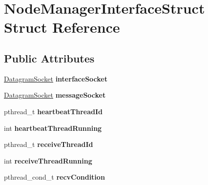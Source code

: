 \hypertarget{struct_node_manager_interface_struct}{\section{\-Node\-Manager\-Interface\-Struct \-Struct \-Reference}
\label{struct_node_manager_interface_struct}
}
\subsection*{\-Public \-Attributes}
\begin{DoxyCompactItemize}
\item 
\hypertarget{struct_node_manager_interface_struct_adf39208cd6a85821e2f73670a50ed920}{\hyperlink{struct_datagram_socket_struct}{\-Datagram\-Socket} {\bfseries interface\-Socket}}\label{struct_node_manager_interface_struct_adf39208cd6a85821e2f73670a50ed920}

\item 
\hypertarget{struct_node_manager_interface_struct_ac996af73bca622eae4af573fd14b31ca}{\hyperlink{struct_datagram_socket_struct}{\-Datagram\-Socket} {\bfseries message\-Socket}}\label{struct_node_manager_interface_struct_ac996af73bca622eae4af573fd14b31ca}

\item 
\hypertarget{struct_node_manager_interface_struct_a41ec3bd4404424d8493b4f8d8d02d9b8}{pthread\-\_\-t {\bfseries heartbeat\-Thread\-Id}}\label{struct_node_manager_interface_struct_a41ec3bd4404424d8493b4f8d8d02d9b8}

\item 
\hypertarget{struct_node_manager_interface_struct_a318dbb2bdae9caacb235e0fc8735bb2b}{int {\bfseries heartbeat\-Thread\-Running}}\label{struct_node_manager_interface_struct_a318dbb2bdae9caacb235e0fc8735bb2b}

\item 
\hypertarget{struct_node_manager_interface_struct_a57bf6e233c0940a4365deaa3b0fa6e1a}{pthread\-\_\-t {\bfseries receive\-Thread\-Id}}\label{struct_node_manager_interface_struct_a57bf6e233c0940a4365deaa3b0fa6e1a}

\item 
\hypertarget{struct_node_manager_interface_struct_a55f9a2806c2d0f026a9027a4bc3b3e90}{int {\bfseries receive\-Thread\-Running}}\label{struct_node_manager_interface_struct_a55f9a2806c2d0f026a9027a4bc3b3e90}

\item 
\hypertarget{struct_node_manager_interface_struct_acdd9f4b77eb07370d9fa26b1d06117b4}{pthread\-\_\-cond\-\_\-t {\bfseries recv\-Condition}}\label{struct_node_manager_interface_struct_acdd9f4b77eb07370d9fa26b1d06117b4}


\end{DoxyCompactItemize}
